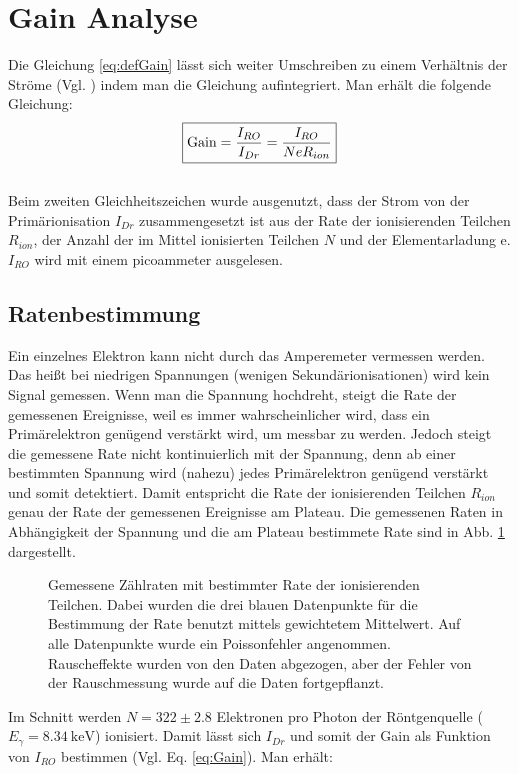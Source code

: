 \section{Gain Analyse}
Die Gleichung \ref{eq:defGain} lässt sich weiter Umschreiben zu einem Verhältnis der Ströme (Vgl. \cite{Anleitungsmappe}) indem man die Gleichung aufintegriert. Man erhält die folgende Gleichung:
\begin{equation}
        \centering
        \boxed{
        \text{Gain}=\frac{I_{RO}}{I_{Dr}} = \frac{I_{RO}}{N e R_{ion}}
        }
\end{equation}    
\label{eq:Gain}\\
Beim zweiten Gleichheitszeichen wurde ausgenutzt, dass der Strom von der Primärionisation $I_{Dr}$ zusammengesetzt ist aus der Rate der ionisierenden Teilchen $R_{ion}$, der Anzahl der im Mittel ionisierten Teilchen $N$ und der Elementarladung e. $I_{RO}$ wird mit einem picoammeter ausgelesen.
\subsection{Ratenbestimmung}
Ein einzelnes Elektron kann nicht durch das Amperemeter vermessen werden. Das heißt bei niedrigen Spannungen (wenigen Sekundärionisationen) wird kein Signal gemessen. Wenn man die Spannung hochdreht, steigt die Rate der gemessenen Ereignisse, weil es immer wahrscheinlicher wird, dass ein Primärelektron genügend verstärkt wird, um messbar zu werden. Jedoch steigt die gemessene Rate nicht kontinuierlich mit der Spannung, denn ab einer bestimmten Spannung wird (nahezu) jedes Primärelektron genügend verstärkt und somit detektiert. Damit entspricht die Rate der ionisierenden Teilchen $R_{ion}$ genau der Rate der gemessenen Ereignisse am Plateau. Die gemessenen Raten in Abhängigkeit der Spannung und die am Plateau bestimmete Rate sind in Abb. \ref{fig:Rate} dargestellt.

\begin{figure}[h]
    \centering
    
    \caption{Gemessene Zählraten mit bestimmter Rate der ionisierenden Teilchen. Dabei wurden die drei blauen Datenpunkte für die Bestimmung der Rate benutzt mittels gewichtetem Mittelwert. Auf alle Datenpunkte wurde ein Poissonfehler angenommen. Rauscheffekte wurden von den Daten abgezogen, aber der Fehler von der Rauschmessung wurde auf die Daten fortgepflanzt.}
    \label{fig:Rate}
\end{figure}

Im Schnitt werden $N=322\pm2.8$ Elektronen pro Photon der Röntgenquelle ($E_{\gamma}=\SI{8.34}{\keV}$) \cite{Anleitungsmappe} ionisiert. Damit lässt sich $I_{Dr}$ und somit der Gain als Funktion von $I_{RO}$ bestimmen (Vgl. Eq. \ref{eq:Gain}). Man erhält:

